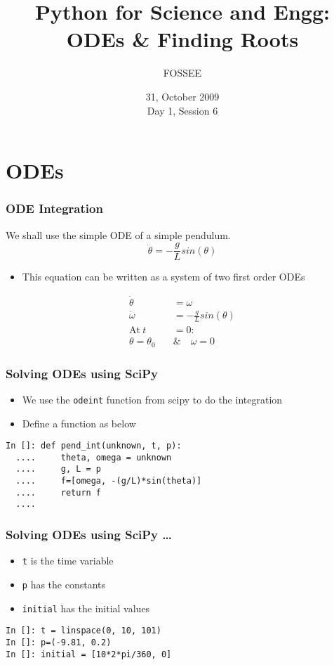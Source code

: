 \documentclass[14pt,compress]{beamer}
\title[ODEs \& Root Finding]{Python for Science and Engg:\\ODEs \& Finding Roots}
\author[FOSSEE] {FOSSEE}
\institute[IIT Bombay] {Department of Aerospace Engineering\\IIT Bombay}
\date[] {31, October 2009\\Day 1, Session 6}
\newcounter{time}
\newcommand{\typ}[1]{\lstinline{#1}}
\begin{document}
\begin{frame}
  \maketitle
\end{frame}


\section{ODEs}

\begin{frame}[fragile]
\frametitle{ODE Integration}
We shall use the simple ODE of a simple pendulum. 
\begin{equation*}
\ddot{\theta} = -\frac{g}{L}sin(\theta)
\end{equation*}
\begin{itemize}
\item This equation can be written as a system of two first order ODEs
\end{itemize}
\begin{align}
\dot{\theta} &= \omega \\
\dot{\omega} &= -\frac{g}{L}sin(\theta) \\
 \text{At}\ t &= 0 : \nonumber \\
 \theta = \theta_0\quad & \&\quad  \omega = 0 \nonumber
\end{align}
\end{frame}

\begin{frame}[fragile]
\frametitle{Solving ODEs using SciPy}
\begin{itemize}
\item We use the \typ{odeint} function from scipy to do the integration
\item Define a function as below
\end{itemize}
\begin{lstlisting}
In []: def pend_int(unknown, t, p):
  ....     theta, omega = unknown
  ....     g, L = p
  ....     f=[omega, -(g/L)*sin(theta)]
  ....     return f
  ....
\end{lstlisting}
\end{frame}

\begin{frame}[fragile]
\frametitle{Solving ODEs using SciPy \ldots}
\begin{itemize}
\item \typ{t} is the time variable \\ 
\item \typ{p} has the constants \\
\item \typ{initial} has the initial values
\end{itemize}
\begin{lstlisting}
In []: t = linspace(0, 10, 101)
In []: p=(-9.81, 0.2)
In []: initial = [10*2*pi/360, 0]
\end{lstlisting}
\end{frame}
\end{document}
